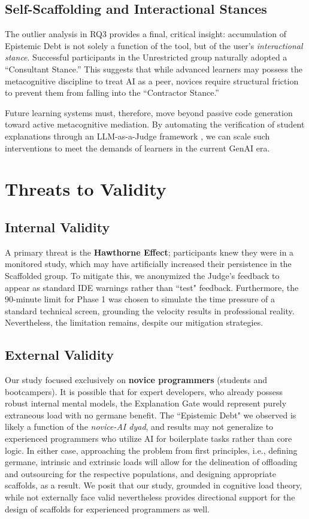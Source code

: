 \documentclass[sigconf]{acmart}
\begin{document}
\subsection{Self-Scaffolding and Interactional Stances}
The outlier analysis in RQ3 provides a final, critical insight: accumulation of Epistemic Debt is not solely a function of the tool, but of the user's \textit{interactional stance}. Successful participants in the Unrestricted group naturally adopted a ``Consultant Stance.'' This suggests that while advanced learners may possess the metacognitive discipline to treat AI as a peer, novices require structural friction to prevent them from falling into the ``Contractor Stance.'' 

Future learning systems must, therefore, move beyond passive code generation toward active metacognitive mediation. By automating the verification of student explanations through an LLM-as-a-Judge framework \cite{choma2025}, we can scale such interventions to meet the demands of learners in the current GenAI era.

\section{Threats to Validity}

\subsection{Internal Validity}
A primary threat is the \textbf{Hawthorne Effect}; participants knew they were in a monitored study, which may have artificially increased their persistence in the Scaffolded group. To mitigate this, we anonymized the Judge's feedback to appear as standard IDE warnings rather than ``test" feedback. Furthermore, the 90-minute limit for Phase 1 was chosen to simulate the time pressure of a standard technical screen, grounding the velocity results in professional reality. Nevertheless, the limitation remains, despite our mitigation strategies.

\subsection{External Validity}
Our study focused exclusively on \textbf{novice programmers} (students and bootcampers). It is possible that for expert developers, who already possess robust internal mental models, the Explanation Gate would represent purely extraneous load with no germane benefit. The ``Epistemic Debt" we observed is likely a function of the \textit{novice-AI dyad}, and results may not generalize to experienced programmers who utilize AI for boilerplate tasks rather than core logic. In either case, approaching the problem from first principles, i.e., defining germane, intrinsic and extrinsic loads will allow for the delineation of offloading and outsourcing for the respective populations, and designing appropriate scaffolds, as a result. We posit that our study, grounded in cognitive load theory, while not externally face valid nevertheless provides directional support for the design of scaffolds for experienced programmers as well.
\end{document}
